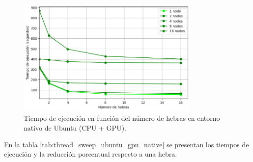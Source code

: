 \begin{figure}[H]
    \centering
    \includegraphics[width=0.8\textwidth]{imagenes/cap5/thread_sweep_ubuntu_gpu_native_time.png}
    \caption{Tiempo de ejecución en función del número de hebras en entorno nativo de Ubuntu (CPU + GPU).}
    \label{fig:thread_sweep_ubuntu_gpu_native_time}
\end{figure}

En la tabla \ref{tab:thread_sweep_ubuntu_gpu_native} se presentan los tiempos de ejecución y la reducción porcentual respecto a una hebra.

